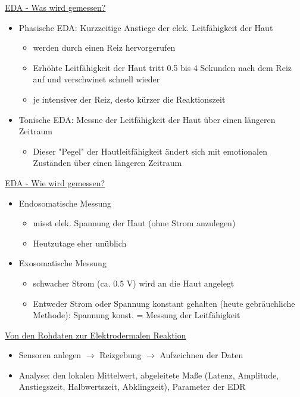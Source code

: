 \documentclass[a4paper,10pt,oneside]{article}
\begin{document}
\underline{EDA - Was wird gemessen?} \\
	\begin{itemize}
		\item Phasische EDA: Kurzzeitige Anstiege der elek. Leitfähigkeit der Haut
			\begin{itemize}
				\item werden durch einen Reiz hervorgerufen
				\item Erhöhte Leitfähigkeit der Haut tritt 0.5 bis 4 Sekunden nach dem Reiz auf und verschwinet schnell wieder
				\item je intensiver der Reiz, desto kürzer die Reaktionszeit
			\end{itemize}
		\item Tonische EDA: Messne der Leitfähigkeit der Haut über einen längeren Zeitraum 
			\begin{itemize}
				\item Dieser "Pegel" der Hautleitfähigkeit ändert sich mit emotionalen Zuständen über einen längeren Zeitraum
			\end{itemize}
	\end{itemize}
	
\underline{EDA - Wie wird gemessen?} \\
	\begin{itemize}
		\item Endosomatische Messung
			\begin{itemize}
				\item misst elek. Spannung der Haut (ohne Strom anzulegen)
				\item Heutzutage eher unüblich
			\end{itemize}
		\item Exosomatische Messung
			\begin{itemize}
				\item schwacher Strom (ca. 0.5 V) wird an
				die Haut angelegt
				\item Entweder Strom oder Spannung konstant gehalten (heute gebräuchliche Methode): Spannung konst. = Messung der Leitfähigkeit
			\end{itemize}
	\end{itemize}
 	

\underline{Von den Rohdaten zur Elektrodermalen Reaktion} \\
	\begin{itemize}
		\item Sensoren anlegen $\rightarrow$ Reizgebung $\rightarrow$ Aufzeichnen der Daten
		\item Analyse: den lokalen Mittelwert, abgeleitete Maße (Latenz, Amplitude, Anstiegszeit, Halbwertszeit, Abklingzeit), Parameter der EDR
	\end{itemize}
 		
\end{document}
